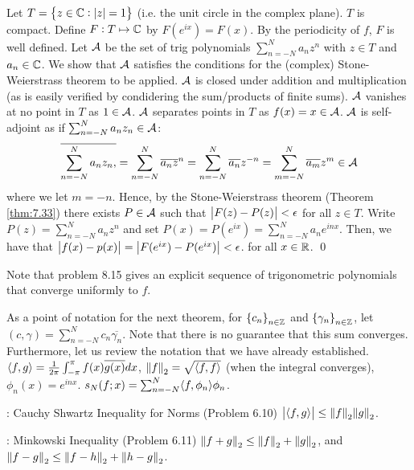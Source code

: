 \begin{nproof}
    Let $T = \set{z \in \mathbb{C}: \abs{z} = 1}$ (i.e. the unit circle in the complex plane). $T$ is compact. Define $F: T \mapsto \mathbb{C}$ by $F(e^{ix}) = F(x)$. By the periodicity of $f$, $F$ is well defined. Let $\mathcal{A}$ be the set of trig polynomials $\sum_{n=-N}^N a_nz^n$ with $z \in T$ and $a_n \in \mathbb{C}$. We show that $\mathcal{A}$ satisfies the conditions for the (complex) Stone-Weierstrass theorem to be applied. $\mathcal{A}$ is closed under addition and multiplication (as is easily verified by condidering the sum/products of finite sums). $\mathcal{A}$ vanishes at no point in $T$ as $1 \in \mathcal{A}$. $\mathcal{A}$ separates points in $T$ as $f(x) = x \in \mathcal{A}$. $\mathcal{A}$ is self-adjoint as if $\sum_{n=-N}^N a_nz_n \in \mathcal{A}$:
    \begin{align*}
        \overline{\sum_{n=-N}^N a_nz_n,} = \sum_{n=-N}^N \overline{a_n}\overline{z}^n = \sum_{n=-N}^N \overline{a_n}z^{-n} = \sum_{m=-N}^N \overline{a_m}z^{m} \in \mathcal{A}
    \end{align*}
    where we let $m = -n$. Hence, by the Stone-Weierstrass theorem (Theorem \ref{thm:7.33}) there exists $P \in \mathcal{A}$ such that $\abs{F(z) - P(z)} < \epsilon$ for all $z \in T$. Write $P(z) = \sum_{n=-N}^N a_nz^n$ and set $P(x) = P(e^{ix}) = \sum_{n=-N}^N a_ne^{inx}$. Then, we have that $\abs{f(x) - p(x)} = \abs{F(e^{ix}) - P(e^{ix})} < \epsilon$. for all $x \in \mathbb{R}$. \qed
\end{nproof}

\noindent Note that problem 8.15 gives an explicit sequence of trigonometric polynomials that converge uniformly to $f$. 

As a point of notation for the next theorem, for $\set{c_n}_{n \in \mathbb{Z}}$ and $\set{\gamma_n}_{n \in \mathbb{Z}}$, let $(c, \gamma) = \sum_{n=-N}^N c_n\overline{\gamma_n}$. Note that there is no guarantee that this sum converges. Furthermore, let us review the notation that we have already established. $\langle f, g \rangle = \frac{1}{2\pi}\int_{-\pi}^\pi f(x)\overline{g(x)}dx$, $\norm{f}_2 = \sqrt{\langle f, f \rangle}$ (when the integral converges), $\phi_n(x) = e^{inx}$. $s_N(f;x) = \sum_{n=-N}^N \langle f, \phi_n \rangle\phi_n$. 

\begin{ntheorem}{: Cauchy Shwartz Inequality for Norms (Problem 6.10)}{}
    $\abs{\langle f, g \rangle} \leq \norm{f}_2\norm{g}_2$.
\end{ntheorem}

\begin{ntheorem}{: Minkowski Inequality (Problem 6.11)}{}
    $\norm{f + g}_2 \leq \norm{f}_2 + \norm{g}_2$, and $\norm{f - g}_2 \leq \norm{f - h}_2 + \norm{h - g}_2$.
\end{ntheorem}

